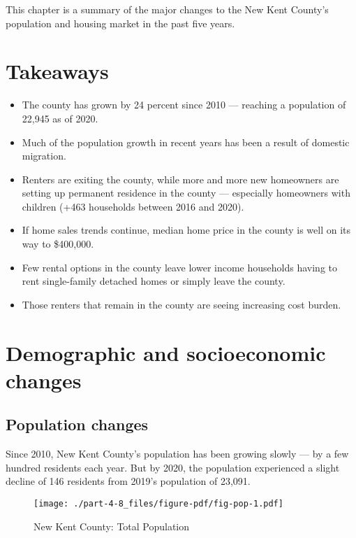 \documentclass[
  letterpaper,
  DIV=11,
  numbers=noendperiod]{scrreprt}
\providecommand{\tightlist}{%
  \setlength{\itemsep}{0pt}\setlength{\parskip}{0pt}}\usepackage{longtable,booktabs,array}
\begin{document}
This chapter is a summary of the major changes to the New Kent County's
population and housing market in the past five years.

\hypertarget{takeaways-7}{%
\section{Takeaways}\label{takeaways-7}}

\begin{itemize}
\tightlist
\item
  The county has grown by 24 percent since 2010 --- reaching a
  population of 22,945 as of 2020.
\item
  Much of the population growth in recent years has been a result of
  domestic migration.
\item
  Renters are exiting the county, while more and more new homeowners are
  setting up permanent residence in the county --- especially homeowners
  with children (+463 households between 2016 and 2020).
\item
  If home sales trends continue, median home price in the county is well
  on its way to \$400,000.
\item
  Few rental options in the county leave lower income households having
  to rent single-family detached homes or simply leave the county.
\item
  Those renters that remain in the county are seeing increasing cost
  burden.
\end{itemize}

\hypertarget{demographic-and-socioeconomic-changes-7}{%
\section{Demographic and socioeconomic
changes}\label{demographic-and-socioeconomic-changes-7}}

\hypertarget{population-changes-7}{%
\subsection{Population changes}\label{population-changes-7}}

Since 2010, New Kent County's population has been growing slowly --- by
a few hundred residents each year. But by 2020, the population
experienced a slight decline of 146 residents from 2019's population of
23,091.

\begin{figure}

{\centering \texttt{[image: ./part-4-8\_files/figure-pdf/fig-pop-1.pdf]}

}

\caption{\label{fig-pop}New Kent County: Total Population}

\end{figure}
\end{document}
